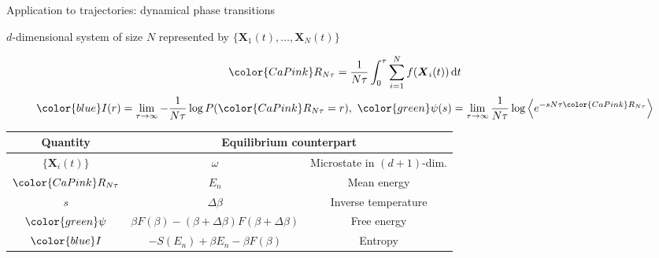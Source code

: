 \documentclass{beamer}
\begin{document}
\begin{frame}{Application to trajectories: dynamical phase transitions}

\begin{center}
$d$-dimensional system of size $N$ represented by $\{\boldsymbol{X}_1(t), \ldots, \boldsymbol{X}_N(t)\}$
\end{center}

\begin{equation}
{\color{CaPink} R_{N \tau}} = \frac{1}{N \tau} \int_0^{\tau} \sum_{i=1}^N f(\boldsymbol{X}_i(t)) \, \text{d}t
\end{equation}
\pause
\begin{equation}
{\color{blue} I}(r) = \lim_{\tau \rightarrow \infty} -\frac{1}{N \tau} \log P({\color{CaPink} R_{N \tau}} = r),~ {\color{green} \psi}(s) = \lim_{\tau \rightarrow \infty} \frac{1}{N \tau} \log \left<e^{-s N \tau {\color{CaPink} R_{N \tau}}}\right>
\end{equation}

\pause
\return
\begin{table}
\begin{tabular}{c | c | c}
\rowcolor{CaLightPink}
\bf Quantity & \multicolumn{2}{c}{\bf Equilibrium counterpart}\\
\hline \hline
\rowcolor{white!90!CaLightPink}
$\{\boldsymbol{X}_i(t)\}$ & $\omega$ & Microstate in $(d+1)$-dim.\\
\rowcolor{white!80!CaLightPink}
${\color{CaPink} R_{N\tau}}$ & $E_n$ & Mean energy\\
\rowcolor{white!90!CaLightPink}
$s$ & $\Delta \beta$ & Inverse temperature\\
\rowcolor{white!80!CaLightPink}
${\color{green} \psi}$ & $\beta F(\beta) - (\beta + \Delta\beta) F(\beta + \Delta\beta)$ & Free energy\\
\rowcolor{white!90!CaLightPink}
${\color{blue} I}$ & $-S(E_n) + \beta E_n - \beta F(\beta)$ & Entropy
\end{tabular}
\end{table}


\end{frame}
\end{document}
